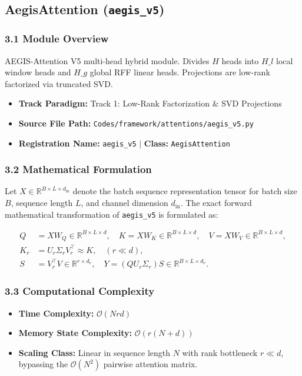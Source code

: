 \subsection{AegisAttention (\texttt{aegis\_v5})}
\label{sec:app_module_aegis_v5}

\subsubsection*{3.1 Module Overview}
AEGIS-Attention V5 multi-head hybrid module.  Divides $H$ heads into $H\_l$ local window heads and $H\_g$ global RFF linear heads. Projections are low-rank factorized via truncated SVD.
\begin{itemize}
    \item \textbf{Track Paradigm:} Track 1: Low-Rank Factorization \& SVD Projections
    \item \textbf{Source File Path:} \texttt{Codes/framework/attentions/aegis\_v5.py}
    \item \textbf{Registration Name:} \texttt{aegis\_v5} $\mid$ \textbf{Class:} \texttt{AegisAttention}
\end{itemize}

\subsubsection*{3.2 Mathematical Formulation}
Let $X \in \mathbb{R}^{B \times L \times d_{\text{in}}}$ denote the batch sequence representation tensor for batch size $B$, sequence length $L$, and channel dimension $d_{\text{in}}$. The exact forward mathematical transformation of \texttt{aegis\_v5} is formulated as:

\begin{align}
Q &= X W_Q \in \mathbb{R}^{B \times L \times d}, \quad K = X W_K \in \mathbb{R}^{B \times L \times d}, \quad V = X W_V \in \mathbb{R}^{B \times L \times d}, \\
K_r &= U_r \Sigma_r V_r^\top \approx K, \quad (r \ll d), \\
S &= V_r^\top V \in \mathbb{R}^{r \times d_v}, \quad Y = (Q U_r \Sigma_r) S \in \mathbb{R}^{B \times L \times d_v}.
\end{align}


\subsubsection*{3.3 Computational Complexity}
\begin{itemize}
    \item \textbf{Time Complexity:} $\mathcal{O}(N r d)$
    \item \textbf{Memory State Complexity:} $\mathcal{O}(r(N + d))$
    \item \textbf{Scaling Class:} Linear in sequence length $N$ with rank bottleneck $r \ll d$, bypassing the $\mathcal{O}(N^2)$ pairwise attention matrix.
\end{itemize}

